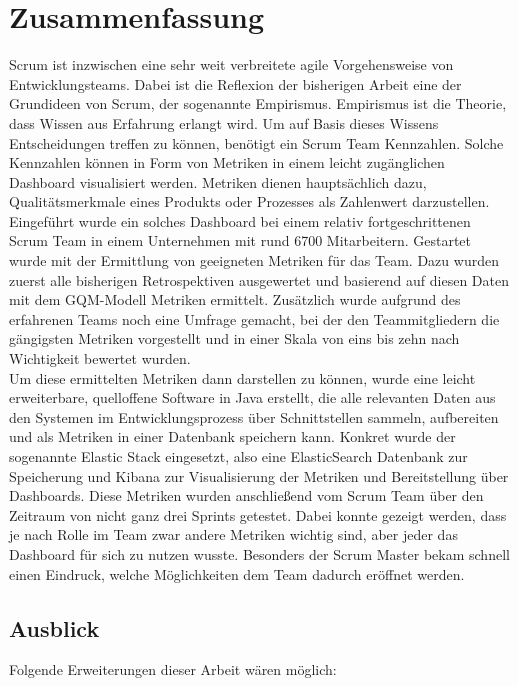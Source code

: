 \chapter{Zusammenfassung}

Scrum ist inzwischen eine sehr weit verbreitete agile Vorgehensweise von Entwicklungsteams.
Dabei ist die Reflexion der bisherigen Arbeit eine der Grundideen von Scrum, der sogenannte Empirismus.
Empirismus ist die Theorie, dass Wissen aus Erfahrung erlangt wird.
Um auf Basis dieses Wissens Entscheidungen treffen zu können, benötigt ein Scrum Team Kennzahlen.
Solche Kennzahlen können in Form von Metriken in einem leicht zugänglichen Dashboard visualisiert werden.
Metriken dienen hauptsächlich dazu, Qualitätsmerkmale eines Produkts oder Prozesses als Zahlenwert darzustellen.
\\
Eingeführt wurde ein solches Dashboard bei einem relativ fortgeschrittenen Scrum Team in einem Unternehmen mit rund 6700 Mitarbeitern.
Gestartet wurde mit der Ermittlung von geeigneten Metriken für das Team.
Dazu wurden zuerst alle bisherigen Retrospektiven ausgewertet und basierend auf diesen Daten mit dem \ac{GQM}-Modell Metriken ermittelt.
Zusätzlich wurde aufgrund des erfahrenen Teams noch eine Umfrage gemacht, bei der den Teammitgliedern die gängigsten Metriken vorgestellt und in einer Skala von eins bis zehn nach Wichtigkeit bewertet wurden.
\\
Um diese ermittelten Metriken dann darstellen zu können, wurde eine leicht erweiterbare, quelloffene Software in Java erstellt, die alle relevanten Daten aus den Systemen im Entwicklungsprozess über Schnittstellen sammeln, aufbereiten und als Metriken in einer Datenbank speichern kann.
Konkret wurde der sogenannte Elastic Stack eingesetzt, also eine ElasticSearch Datenbank zur Speicherung und Kibana zur Visualisierung der Metriken und Bereitstellung über Dashboards.
Diese Metriken wurden anschließend vom Scrum Team über den Zeitraum von nicht ganz drei Sprints getestet.
Dabei konnte gezeigt werden, dass je nach Rolle im Team zwar andere Metriken wichtig sind, aber jeder das Dashboard für sich zu nutzen wusste.
Besonders der Scrum Master bekam schnell einen Eindruck, welche Möglichkeiten dem Team dadurch eröffnet werden.

\section*{Ausblick}

Folgende Erweiterungen dieser Arbeit wären möglich:

